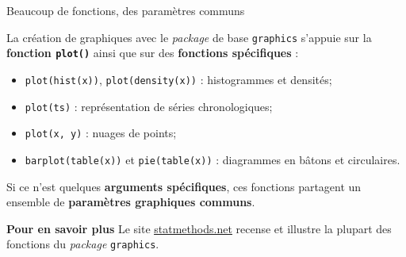 \documentclass[12pt,ignorenonframetext,handout,]{beamer}
\providecommand{\tightlist}{%
  \setlength{\itemsep}{0pt}\setlength{\parskip}{0pt}}
\newcommand{\intertitre}[1]{\textcolor{redInsee}{\textbf{#1}}}
\begin{document}
\begin{frame}[fragile]{\large Beaucoup de fonctions, des paramètres
communs}
\protect\hypertarget{beaucoup-de-fonctions-des-parametres-communs}{}

La création de graphiques avec le \emph{package} de base
\texttt{graphics} s’appuie sur la \textbf{fonction \texttt{plot()}}
ainsi que sur des \textbf{fonctions spécifiques} :

\begin{itemize}
\tightlist
\item
  \texttt{plot(hist(x))}, \texttt{plot(density(x))} : histogrammes et
  densités;
\item
  \texttt{plot(ts)} : représentation de séries chronologiques;
\item
  \texttt{plot(x,\ y)} : nuages de points;
\item
  \texttt{barplot(table(x))} et \texttt{pie(table(x))} : diagrammes en
  bâtons et circulaires.
\end{itemize}

\pause Si ce n’est quelques \textbf{arguments spécifiques}, ces
fonctions partagent un ensemble de \textbf{paramètres graphiques
communs}.

\pause

\intertitre{Pour en savoir plus} Le site
\href{http://www.statmethods.net/graphs/}{\underline{statmethods.net}}
recense et illustre la plupart des fonctions du \emph{package}
\texttt{graphics}.

\end{frame}
\end{document}
